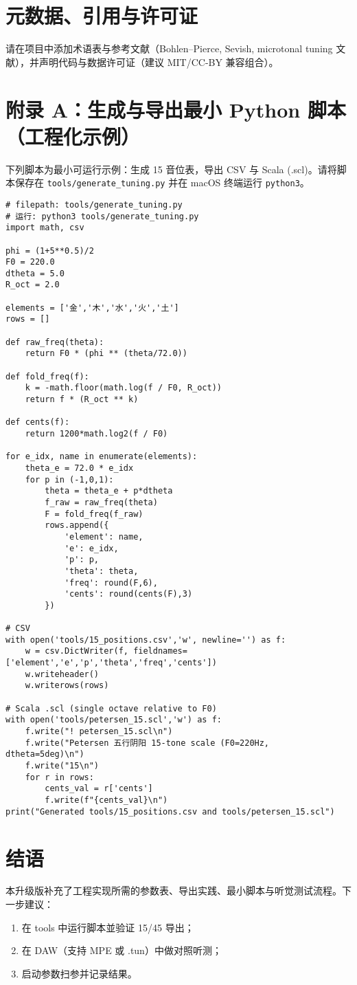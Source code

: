 \documentclass{article}
\begin{document}
\section{元数据、引用与许可证}
请在项目中添加术语表与参考文献（Bohlen–Pierce, Sevish, microtonal tuning 文献），并声明代码与数据许可证（建议 MIT/CC-BY 兼容组合）。

\section{附录 A：生成与导出最小 Python 脚本（工程化示例）}
下列脚本为最小可运行示例：生成 15 音位表，导出 CSV 与 Scala (.scl)。请将脚本保存在 \texttt{tools/generate\_tuning.py} 并在 macOS 终端运行 \texttt{python3}。

\begin{verbatim}
# filepath: tools/generate_tuning.py
# 运行: python3 tools/generate_tuning.py
import math, csv

phi = (1+5**0.5)/2
F0 = 220.0
dtheta = 5.0
R_oct = 2.0

elements = ['金','木','水','火','土']
rows = []

def raw_freq(theta):
    return F0 * (phi ** (theta/72.0))

def fold_freq(f):
    k = -math.floor(math.log(f / F0, R_oct))
    return f * (R_oct ** k)

def cents(f):
    return 1200*math.log2(f / F0)

for e_idx, name in enumerate(elements):
    theta_e = 72.0 * e_idx
    for p in (-1,0,1):
        theta = theta_e + p*dtheta
        f_raw = raw_freq(theta)
        F = fold_freq(f_raw)
        rows.append({
            'element': name,
            'e': e_idx,
            'p': p,
            'theta': theta,
            'freq': round(F,6),
            'cents': round(cents(F),3)
        })

# CSV
with open('tools/15_positions.csv','w', newline='') as f:
    w = csv.DictWriter(f, fieldnames=['element','e','p','theta','freq','cents'])
    w.writeheader()
    w.writerows(rows)

# Scala .scl (single octave relative to F0)
with open('tools/petersen_15.scl','w') as f:
    f.write("! petersen_15.scl\n")
    f.write("Petersen 五行阴阳 15-tone scale (F0=220Hz, dtheta=5deg)\n")
    f.write("15\n")
    for r in rows:
        cents_val = r['cents']
        f.write(f"{cents_val}\n")
print("Generated tools/15_positions.csv and tools/petersen_15.scl")
\end{verbatim}

\section{结语}
本升级版补充了工程实现所需的参数表、导出实践、最小脚本与听觉测试流程。下一步建议：
\begin{enumerate}
  \item 在 tools 中运行脚本並验证 15/45 导出；
  \item 在 DAW（支持 MPE 或 .tun）中做对照听测；
  \item 启动参数扫参并记录结果。
\end{enumerate}
\end{document}

